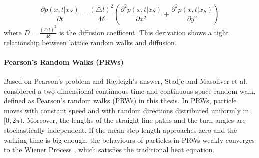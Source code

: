 \begin{equation}\label{eq:lrws_heat}
  \frac{\partial p(x, t| x_{S})}{\partial t} = \frac{(\triangle
    l)^2}{4 \delta} (\frac{\partial ^2 p(x, t| x_{S})}{\partial x^2} +
  \frac{\partial^2 p (x, t| x_{S})}{\partial y^2})
\end{equation}
where $D = \frac{(\triangle l)^2}{4 \delta}$ is the diffusion coefficent. This derivation shows a tight relationship between lattice random walks and diffusion.



\paragraph{Pearson's Random Walks (PRWs)}

Based on Pearson's problem and Rayleigh's answer, Stadje
\cite{stadje1987exact} and Masoliver et al. \cite{masoliver1993some} considered a two-dimensional continuous-time and continuous-space random walk, defined as Pearson's random walks (PRWs) in this thesis. In PRWs, particle moves with constant speed and with random directions distributed uniformly in $[0, 2\pi)$. Moreover, the lengths of the straight-line paths and the turn angles are stochastically independent. If the mean step length approaches zero and the walking time is big enough, the behaviours of particles in PRWs weakly converges to the Wiener Process \cite{stadje1987exact}, which satisfies the traditional heat equation.
